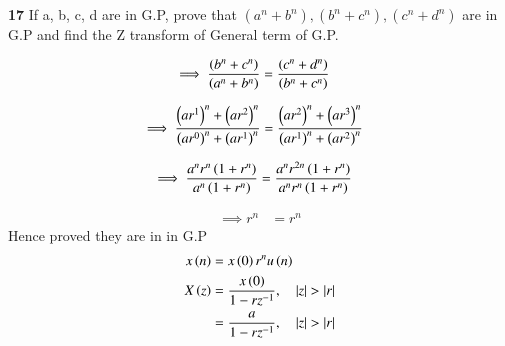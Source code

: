 \documentclass[journal,12pt,twocolumn]{IEEEtran}
\theoremstyle{remark}
\begin{document}


\vspace{3cm}

\title{}
\author{EE23BTECH11047 - Deepakreddy P
}
\maketitle
\newpage
\bigskip

\noindent \textbf{17} \quad 
If a, b, c, d are in G.P, prove that 
$ (a^{n} + b^{n}),(b^{n} + c^{n}),(c^{n} + d^{n}) $ are in G.P and find the Z transform of General term of G.P.\\
\solution

\begin{center}
    \begin{table}[ht]
        
    \end{table}
\end{center}

\begin{align} \implies \frac{\left(b^n + c^n\right)}{\left(a^n + b^n\right)} &= \frac{\left(c^n + d^n\right)}{\left(b^n + c^n\right)} \end{align}

\begin{align} \implies \frac{\left(ar^1\right)^n + \left(ar^2\right)^n}{\left(ar^0\right)^n + \left(ar^1\right)^n}  &= \frac{\left(ar^2\right)^n + \left(ar^3\right)^n}{\left(ar^1\right)^n + \left(ar^2\right)^n} \end{align}

\begin{align} \implies \frac{a^n r^n \left(1 + r^n\right)}{a^n \left(1 + r^n\right)} &= \frac{a^n r^{2n} \left(1 + r^n\right)}{a^n r^n \left(1 + r^n\right)} \end{align}

\begin{align} \implies r^n &= r^n \end{align}
Hence proved they are in in G.P
\begin{align}
    x\brak{n} &= x\brak{0}r^{n} u\brak{n}\\
    X\brak{z} &= \frac{x\brak{0}}{1-rz^{-1}}, \quad |z|>|r|\\
    &= \frac{a}{1-rz^{-1}}, \quad |z|>|r|
\end{align}
\end{document}
